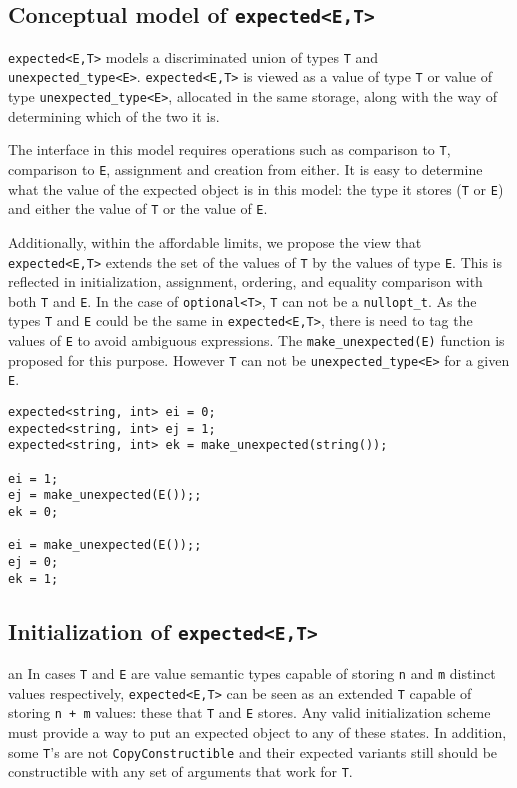 \documentclass[a4paper,10pt]{article}
\newcommand{\cpp}[1]{\lstinline{#1}}
\begin{document}
\subsection{Conceptual model of \cpp{expected<E,T>}}

\cpp{expected<E,T>} models a discriminated union of types \cpp{T} and \cpp{unexpected_type<E>}. \cpp{expected<E,T>} is viewed as a value of type \cpp{T} or value of type \cpp{unexpected_type<E>}, allocated in the same storage, along with the way of determining which of the two it is. 

The interface in this model requires operations such as comparison to \cpp{T}, comparison to \cpp{E}, assignment and creation from either. It is easy to determine what the value of the expected object is in this model: the type it stores (\cpp{T} or \cpp{E}) and either the value of \cpp{T} or the value of \cpp{E}. 

Additionally, within the affordable limits, we propose the view that \cpp{expected<E,T>} extends the set of the values of \cpp{T} by the values of type \cpp{E}. This is reflected in initialization, assignment, ordering, and equality comparison with both \cpp{T} and \cpp{E}. In the case of  \cpp{optional<T>}, \cpp{T} can not be a \cpp{nullopt_t}. As the types \cpp{T} and \cpp{E} could be the same in \cpp{expected<E,T>}, there is need to tag the values of \cpp{E} to avoid ambiguous expressions. The \cpp{make_unexpected(E)} function is proposed for this purpose. However \cpp{T} can not be  \cpp{unexpected_type<E>} for a given \cpp{E}.

\begin{lstlisting}
expected<string, int> ei = 0;
expected<string, int> ej = 1;
expected<string, int> ek = make_unexpected(string());

ei = 1;
ej = make_unexpected(E());;
ek = 0;

ei = make_unexpected(E());;
ej = 0;
ek = 1;
\end{lstlisting}

\subsection{Initialization of \cpp{expected<E,T>}}
an
In cases \cpp{T} and \cpp{E} are value semantic types capable of storing \cpp{n} and \cpp{m} distinct values respectively, \cpp{expected<E,T>} can be seen as an extended \cpp{T} capable of storing \cpp{n + m} values: these that \cpp{T} and \cpp{E} stores. Any valid initialization scheme must provide a way to put an expected object to any of these states. In addition, some \cpp{T}'s  are not \cpp{CopyConstructible} and their expected variants still should be constructible with any set of arguments that work for \cpp{T}.
\end{document}

